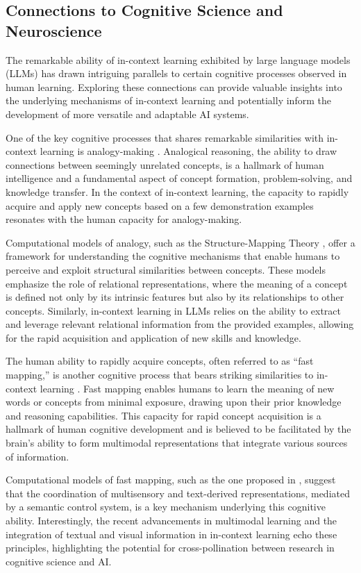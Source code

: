 \documentclass[11pt]{article}
\begin{document}
\subsection{Connections to Cognitive Science and Neuroscience}

The remarkable ability of in-context learning exhibited by large language models (LLMs) has drawn intriguing parallels to certain cognitive processes observed in human learning. Exploring these connections can provide valuable insights into the underlying mechanisms of in-context learning and potentially inform the development of more versatile and adaptable AI systems.

One of the key cognitive processes that shares remarkable similarities with in-context learning is analogy-making \cite{ref48}. Analogical reasoning, the ability to draw connections between seemingly unrelated concepts, is a hallmark of human intelligence and a fundamental aspect of concept formation, problem-solving, and knowledge transfer. In the context of in-context learning, the capacity to rapidly acquire and apply new concepts based on a few demonstration examples resonates with the human capacity for analogy-making.

Computational models of analogy, such as the Structure-Mapping Theory \cite{ref48}, offer a framework for understanding the cognitive mechanisms that enable humans to perceive and exploit structural similarities between concepts. These models emphasize the role of relational representations, where the meaning of a concept is defined not only by its intrinsic features but also by its relationships to other concepts. Similarly, in-context learning in LLMs relies on the ability to extract and leverage relevant relational information from the provided examples, allowing for the rapid acquisition and application of new skills and knowledge.

The human ability to rapidly acquire concepts, often referred to as ``fast mapping,'' is another cognitive process that bears striking similarities to in-context learning \cite{ref49}. Fast mapping enables humans to learn the meaning of new words or concepts from minimal exposure, drawing upon their prior knowledge and reasoning capabilities. This capacity for rapid concept acquisition is a hallmark of human cognitive development and is believed to be facilitated by the brain's ability to form multimodal representations that integrate various sources of information.

Computational models of fast mapping, such as the one proposed in \cite{ref49}, suggest that the coordination of multisensory and text-derived representations, mediated by a semantic control system, is a key mechanism underlying this cognitive ability. Interestingly, the recent advancements in multimodal learning and the integration of textual and visual information in in-context learning \cite{ref50,ref51} echo these principles, highlighting the potential for cross-pollination between research in cognitive science and AI.
\end{document}
